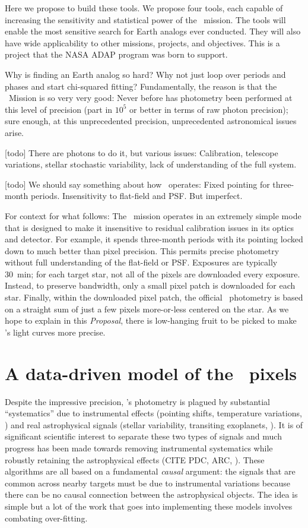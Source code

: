 \documentclass[letterpaper,12pt,preprint]{hack_aastex}
\newcommand{\documentname}{\textsl{Proposal}}
\begin{document}
Here we propose to build these tools.
We propose four tools, each capable of increasing the sensitivity and
statistical power of the \Kepler\ mission.
The tools will enable the most sensitive search for Earth analogs ever
conducted.
They will also have wide applicability to other missions, projects, and
objectives.
This is a project that the NASA ADAP program was born to support.

Why is finding an Earth analog so hard?
Why not just loop over periods and phases and start chi-squared fitting?
Fundamentally, the reason is that the \Kepler\ Mission is so very very good:
Never before has photometry been performed at this level of precision (part
in $10^{5}$ or better in terms of raw photon precision);
sure enough, at this unprecedented precision, unprecedented astronomical
issues arise.

[todo] There are photons to do it, but various issues:  Calibration, telescope variations, stellar stochastic variability, lack of understanding of the full system.

[todo] We should say something about how \Kepler\ operates:  Fixed pointing for three-month periods.  Insensitivity to flat-field and PSF.  But imperfect.

For context for what follows:
The \Kepler\ mission operates in an extremely simple mode that is designed to
make it insensitive to residual calibration issues in its optics and detector.
For example, it spends three-month periods with its pointing locked down to
much better than pixel precision.
This permits precise photometry without full understanding of the flat-field
or PSF.
Exposures are typically 30~min;
for each target star, not all of the pixels are downloaded every exposure.
Instead, to preserve bandwidth, only a small pixel patch is downloaded for each
star.
Finally, within the downloaded pixel patch, the official \Kepler\ photometry
is based on a straight sum of just a few pixels more-or-less centered on the
star.
As we hope to explain in this \documentname, there is low-hanging fruit to be
picked to make \Kepler's light curves more precise.

\section{A data-driven model of the \Kepler\ pixels}

Despite the impressive precision, \Kepler's photometry is plagued by
substantial ``systematics'' due to instrumental effects (pointing shifts,
temperature variations, \etc) and real astrophysical signals (stellar
variability, transiting exoplanets, \etc).
It is of significant scientific interest to separate these two types of
signals and much progress has been made towards removing instrumental
systematics while robustly retaining the astrophysical effects (CITE PDC, ARC,
\etc).
These algorithms are all based on a fundamental \emph{causal} argument: the
signals that are common across nearby targets must be due to instrumental
variations because there can be no causal connection between the astrophysical
objects.
The idea is simple but a lot of the work that goes into implementing these
models involves combating over-fitting.
\end{document}

